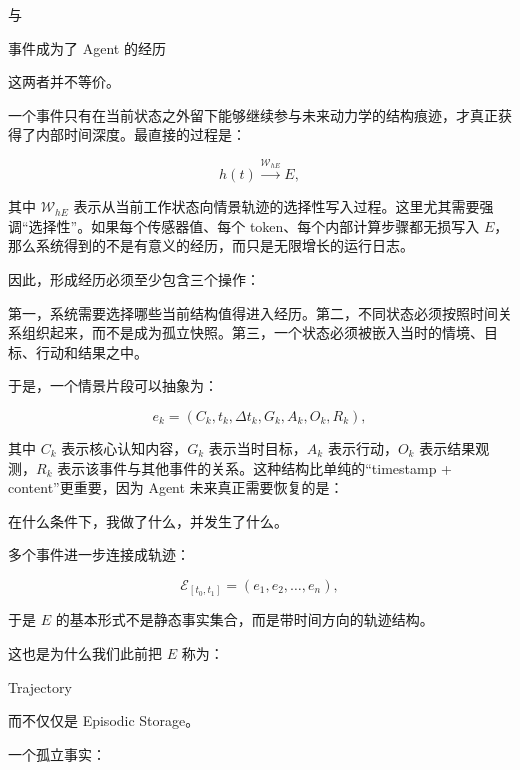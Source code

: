 与

\begin{statementbox}
事件成为了 Agent 的经历
\end{statementbox}

这两者并不等价。

一个事件只有在当前状态之外留下能够继续参与未来动力学的结构痕迹，才真正获得了内部时间深度。最直接的过程是：

\[
h(t)
\xrightarrow{\mathcal{W}_{hE}}
E,
\]

其中 $\mathcal{W}_{hE}$ 表示从当前工作状态向情景轨迹的选择性写入过程。这里尤其需要强调“选择性”。如果每个传感器值、每个 token、每个内部计算步骤都无损写入 $E$，那么系统得到的不是有意义的经历，而只是无限增长的运行日志。

因此，形成经历必须至少包含三个操作：

\begin{statementbox}
\centering
{}
\end{statementbox}

第一，系统需要选择哪些当前结构值得进入经历。第二，不同状态必须按照时间关系组织起来，而不是成为孤立快照。第三，一个状态必须被嵌入当时的情境、目标、行动和结果之中。

于是，一个情景片段可以抽象为：

\[
e_k
=
\left(
C_k,
t_k,
\Delta t_k,
G_k,
A_k,
O_k,
R_k
\right),
\]

其中 $C_k$ 表示核心认知内容，$G_k$ 表示当时目标，$A_k$ 表示行动，$O_k$ 表示结果观测，$R_k$ 表示该事件与其他事件的关系。这种结构比单纯的“timestamp + content”更重要，因为 Agent 未来真正需要恢复的是：

\begin{statementbox}
在什么条件下，我做了什么，并发生了什么。
\end{statementbox}

多个事件进一步连接成轨迹：

\[
\mathcal{E}_{[t_0,t_1]}
=
(e_1,e_2,\ldots,e_n),
\]

于是 $E$ 的基本形式不是静态事实集合，而是带时间方向的轨迹结构。

这也是为什么我们此前把 $E$ 称为：

\begin{statementbox}
Trajectory
\end{statementbox}

而不仅仅是 Episodic Storage。

一个孤立事实：

